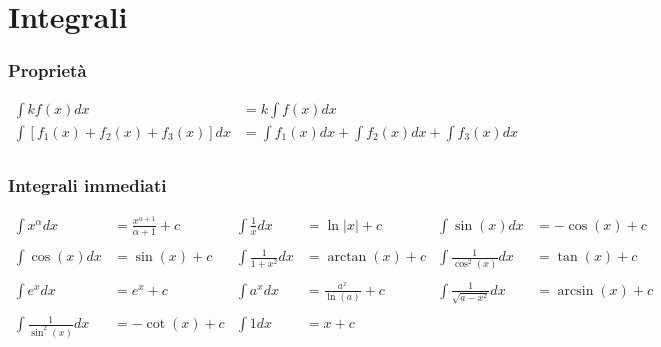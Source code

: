 \documentclass[a4paper]{article}
\begin{document}
	
	
	
	\newpage
	\section{Integrali}
	\subsubsection*{Proprietà}
	\begin{align*}
		\int k f(x) dx &= k \int f(x) dx\\
		\int \left[f_1(x)+f_2(x)+f_3(x)\right]dx &= \int f_1(x)dx + \int f_2(x)dx + \int f_3(x)dx\\
	\end{align*}
	
	\subsubsection*{Integrali immediati}
	\begin{align*}
		\int x^\alpha dx            & = \frac{x^{\alpha + 1}}{\alpha + 1} +c & \int \frac{1}{x}dx     & = \ln|x| + c              & \int \sin (x) dx              & = -\cos(x) + c    \\
		                            &                                        &  \\
		\int \cos (x) dx            & = \sin (x) +c                          & \int \frac{1}{1+x^2}dx & = \arctan (x) +c          & \int \frac{1}{\cos^2 (x)}dx   & = \tan (x) + c    \\
		                            &                                        &  \\
		\int e^x dx                 & = e^x +c                               & \int a^x dx            & = \frac{a^x}{\ln (a)} + c & \int \frac{1}{\sqrt{a-x^2}}dx & = \arcsin (x) + c \\
		                            &  \\
		\int \frac{1}{\sin^2 (x)}dx & = -\cot(x) + c                         & \int 1 dx              & = x+c                     &\\
	\end{align*}
	
\end{document}
